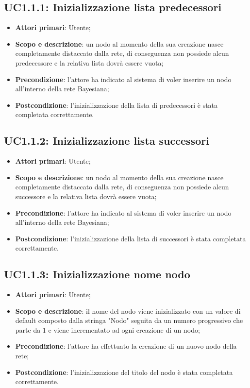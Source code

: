 \subsection{UC1.1.1: Inizializzazione lista predecessori} 
\hypertarget{UC1.1.1}{} 
\begin{itemize} 
	\item{\textbf{Attori primari}: Utente;} 
	\item{\textbf{Scopo e descrizione}: un nodo al momento della sua creazione nasce completamente distaccato dalla rete, di conseguenza non possiede alcun predecessore e la relativa lista dovrà essere vuota;} 
	\item{\textbf{Precondizione}: l'attore ha indicato al sistema di voler inserire un nodo all'interno della rete Bayesiana;} 
	\item{\textbf{Postcondizione}: l'inizializzazione della lista di predecessori è stata completata correttamente.} 
\end{itemize} 
\subsection{UC1.1.2: Inizializzazione lista successori} 
\hypertarget{UC1.1.2}{} 
\begin{itemize} 
	\item{\textbf{Attori primari}: Utente;} 
	\item{\textbf{Scopo e descrizione}: un nodo al momento della sua creazione nasce completamente distaccato dalla rete, di conseguenza non possiede alcun successore e la relativa lista dovrà essere vuota;} 
	\item{\textbf{Precondizione}: l'attore ha indicato al sistema di voler inserire un nodo all'interno della rete Bayesiana;} 
	\item{\textbf{Postcondizione}: l'inizializzazione della lista di successori è stata completata correttamente.} 
\end{itemize} 
\subsection{UC1.1.3: Inizializzazione nome nodo}
\hypertarget{UC1.1.3}{}  
\begin{itemize} 
	\item{\textbf{Attori primari}: Utente;} 
	\item{\textbf{Scopo e descrizione}: il nome del nodo viene inizializzato con un valore di default composto dalla stringa "Nodo" seguita da un numero progressivo che parte da 1 e viene incrementato ad ogni creazione di un nodo;} 
	\item{\textbf{Precondizione}: l'attore ha effettuato la creazione di un nuovo nodo della rete;} 
	\item{\textbf{Postcondizione}: l'inizializzazione del titolo del nodo è stata completata correttamente.} 
\end{itemize} 

